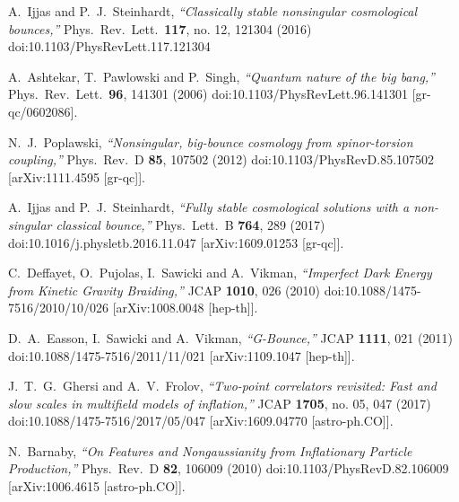 \documentclass[aps,prd,reprint,twocolumn,showpacs,nofootinbib,superscriptaddress,floatfix]{revtex4-1}
\begin{document}
\begin{thebibliography}{99}

  A.~Ijjas and P.~J.~Steinhardt,
  \textit{``Classically stable nonsingular cosmological bounces,''}
  Phys.\ Rev.\ Lett.\  {\bf 117}, no. 12, 121304 (2016)
  doi:10.1103/PhysRevLett.117.121304

  A.~Ashtekar, T.~Pawlowski and P.~Singh,
  \textit{``Quantum nature of the big bang,''}
  Phys.\ Rev.\ Lett.\  {\bf 96}, 141301 (2006)
  doi:10.1103/PhysRevLett.96.141301
  [gr-qc/0602086].
  
  N.~J.~Poplawski,
  \textit{``Nonsingular, big-bounce cosmology from spinor-torsion coupling,''}
  Phys.\ Rev.\ D {\bf 85}, 107502 (2012)
  doi:10.1103/PhysRevD.85.107502
  [arXiv:1111.4595 [gr-qc]].
  
  A.~Ijjas and P.~J.~Steinhardt,
  \textit{``Fully stable cosmological solutions with a non-singular classical bounce,''}
  Phys.\ Lett.\ B {\bf 764}, 289 (2017)
  doi:10.1016/j.physletb.2016.11.047
  [arXiv:1609.01253 [gr-qc]].
  
  C.~Deffayet, O.~Pujolas, I.~Sawicki and A.~Vikman,
  \textit{``Imperfect Dark Energy from Kinetic Gravity Braiding,''}
  JCAP {\bf 1010}, 026 (2010)
  doi:10.1088/1475-7516/2010/10/026
  [arXiv:1008.0048 [hep-th]].
  
  D.~A.~Easson, I.~Sawicki and A.~Vikman,
 \textit{``G-Bounce,''}
  JCAP {\bf 1111}, 021 (2011)
  doi:10.1088/1475-7516/2011/11/021
  [arXiv:1109.1047 [hep-th]].
  
  
  J.~T.~G.~Ghersi and A.~V.~Frolov,
  \textit{``Two-point correlators revisited: Fast and slow scales in multifield models of inflation,''}
  JCAP {\bf 1705}, no. 05, 047 (2017)
  doi:10.1088/1475-7516/2017/05/047
  [arXiv:1609.04770 [astro-ph.CO]].
  
  N.~Barnaby,
  \textit{``On Features and Nongaussianity from Inflationary Particle Production,''}
  Phys.\ Rev.\ D {\bf 82}, 106009 (2010)
  doi:10.1103/PhysRevD.82.106009
  [arXiv:1006.4615 [astro-ph.CO]].

\end{thebibliography}
\end{document}
